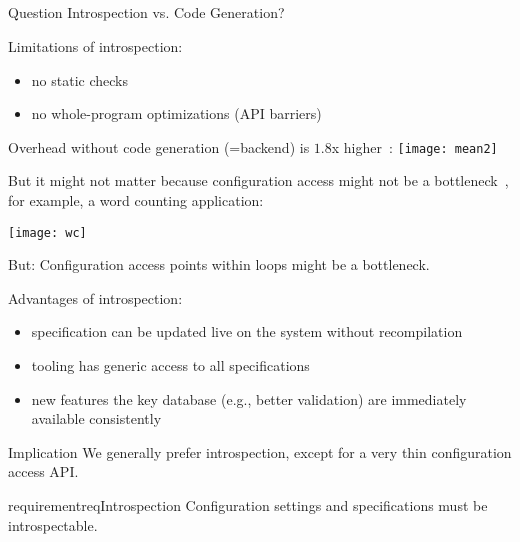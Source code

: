 \subsection{}

\begin{frame}
	\begin{alertblock}{Question}
	Introspection vs. Code Generation?
	\end{alertblock}
\end{frame}

\begin{frame}
	Limitations of introspection:
	\begin{itemize}
	\item no static checks
	\item no whole-program optimizations (API barriers)
	\end{itemize}
\end{frame}

\begin{frame}
	Overhead without code generation (=backend) is $1.8$x higher~\cite{raab2015kps}:
	\texttt{[image: mean2]}
\end{frame}

\begin{frame}
	But it might not matter because configuration access might not be a bottleneck~\cite{raab2015kps},
	for example, a word counting application:

	\texttt{[image: wc]}

	But: \pause
	Configuration access points within loops might be a bottleneck.
\end{frame}

\begin{frame}
	Advantages of introspection:
	\pause
	\begin{itemize}
	\item specification can be updated live on the system without recompilation
	\item tooling has generic access to all specifications
 	\item new features the key database (e.g., better validation) are immediately available consistently
	\end{itemize}
	\vspace{1em}
	\begin{alertblock}{Implication}
	We generally prefer introspection, except for a very thin configuration access API.
	\end{alertblock}
	\vspace{1em}
	\begin{restatable}{requirement}{reqIntrospection}
	Configuration settings and specifications must be introspectable.%
	\end{restatable}
\end{frame}


